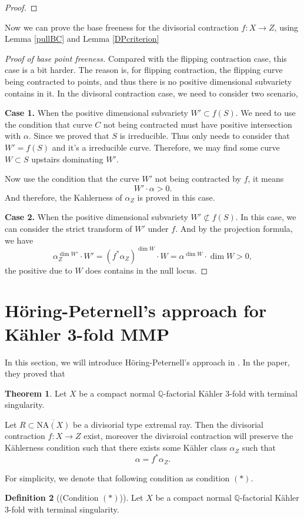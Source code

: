 \documentclass[11pt]{article}
\theoremstyle{definition}
\newtheorem{theorem}{Theorem}
\newtheorem{definition}[theorem]{Definition}
\begin{document}
	\begin{proof}
		
	\end{proof}
	Now we can prove the base freeness for the divisorial contraction $f:X\to Z$, using Lemma \ref{pullBC} and Lemma \ref{DPcriterion}
	\begin{proof}[Proof of base point freeness]
		Compared with the flipping contraction case, this case is a bit harder. The reason is, for flipping contraction, the flipping curve being contracted to points, and thus there is no positive dimensional subvariety contains in it. In the divisoral contraction case, we need to consider two scenario, 
		
		\textbf{Case 1.} When the positive dimensional subvariety $W '\subset f(S)$. We need to use the condition that curve $C$ not being contracted must have positive intersection with $\alpha$. Since we proved that $S$ is irreducible. Thus only needs to consider that $W'= f(S)$ and it's a irreducible curve. Therefore, we may find some curve $W\subset S$ upstairs dominating $W'$. 
		
		Now use the condition that the curve $W'$ not being contracted by $f$, it means $$W' \cdot \alpha >0.$$
		And therefore, the Kahlerness of $\alpha_Z$ is proved in this case.
		
		\textbf{Case 2.} When the positive dimensional subvariety $W'\not \subset f(S)$. In this case, we can consider the strict transform of $W'$ under $f$. And by the projection formula, we have $$\alpha_Z^{\dim W'}\cdot W' = (f^* \alpha_Z )^{\dim W}\cdot W =  \alpha ^{\dim W} \cdot \dim W >0,$$
		the positive due to $W$ does contains in the null locus. 
		
	\end{proof}
	
	\section{H\"oring-Peternell's approach for K\"ahler 3-fold MMP}
	In this section, we will introduce H\"oring-Peternell's approach in \cite{HP16}. In the paper, they proved that 
	\begin{theorem}
		Let $X$ be a compact normal $\mathbb{Q}$-factorial K\"ahler 3-fold with terminal singularity. 
		
		Let $R\subset 
		\overline{\text{NA}(X)}$ be a divisorial type extremal ray. Then the divisorial contraction $f:X\to Z$ exist, moreover the divisroial contraction will preserve the K\"ahlerness condition such that there exists some K\"ahler class $\alpha_Z$ such that $$\alpha = f^* \alpha_Z.$$
	\end{theorem}
	For simplicity, we denote that following condition as condition $(*)$.
	\begin{definition}[(Condition $(*)$)]
		Let $X$ be a compact normal $\mathbb{Q}$-factorial K\"ahler 3-fold with terminal singularity. 
	\end{definition}
	
\end{document}
